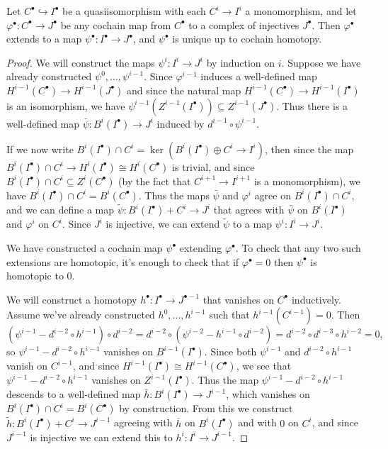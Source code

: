 \begin{thm}\label{resolution} Let $C^\bullet \hookrightarrow I^\bullet$ be a quasiisomorphism with each $C^i \rightarrow I^i$ a monomorphism, and let $\varphi^\bullet: C^\bullet \rightarrow J^\bullet$ be any cochain map from $C^\bullet$ to a complex of injectives $J^\bullet$. Then $\varphi^\bullet$ extends to a map $\psi^\bullet: I^\bullet \rightarrow J^\bullet$, and $\psi^\bullet$ is unique up to cochain homotopy.
\end{thm}
\begin{proof} We will construct the maps $\psi^i : I^i \rightarrow J^i$ by induction on $i$. Suppose we have already constructed $\psi^0, ..., \psi^{i-1}$. Since $\varphi^{i-1}$ induces a well-defined map $H^{i-1}(C^\bullet) \rightarrow H^{i-1}(J^\bullet)$ and since the natural map $H^{i-1}(C^\bullet) \rightarrow H^{i-1}(I^\bullet)$ is an isomorphism, we have $\psi^{i-1}(Z^{i-1}(I^\bullet)) \subseteq Z^{i-1}(J^\bullet)$. Thus there is a well-defined map $\bar\psi : B^i(I^\bullet) \rightarrow J^i$ induced by $d^{i-1}\circ\psi^{i-1}$.

If we now write $B^i(I^\bullet)\cap C^i = \ker(B^i(I^\bullet)\oplus C^i \rightarrow I^i)$, then since the map $B^i(I^\bullet)\cap C^i \rightarrow H^i(I^\bullet) \cong H^i(C^\bullet)$ is trivial, and since $B^i(I^\bullet)\cap C^i \subseteq Z^i(C^\bullet)$ (by the fact that $C^{i+1}\rightarrow I^{i+1}$ is a monomorphism), we have $B^i(I^\bullet)\cap C^i = B^i(C^\bullet)$. Thus the maps $\bar\psi$ and $\varphi^i$ agree on $B^i(I^\bullet)\cap C^i$, and we can define a map $\widetilde\psi : B^i(I^\bullet)+C^i \rightarrow J^i$ that agrees with $\bar\psi$ on $B^i(I^\bullet)$ and $\varphi^i$ on $C^i$. Since $J^i$ is injective, we can extend $\widetilde\psi$ to a map $\psi^i:I^i\rightarrow J^i$.

We have constructed a cochain map $\psi^\bullet$ extending $\varphi^\bullet$. To check that any two such extensions are homotopic, it's enough to check that if $\varphi^\bullet = 0$ then $\psi^\bullet$ is homotopic to $0$.

We will construct a homotopy $h^\bullet : I^\bullet \rightarrow J^{\bullet-1}$ that vanishes on $C^\bullet$ inductively. Assume we've already constructed $h^0, ..., h^{i-1}$ such that $h^{i-1}(C^{i-1}) = 0$. Then
\[
(\psi^{i-1} - d^{i-2}\circ h^{i-1})\circ d^{i-2} = d^{i-2}\circ(\psi^{i-2} - h^{i-1}\circ d^{i-2}) = d^{i-2}\circ d^{i-3}\circ h^{i-2} = 0,
\]
so $\psi^{i-1} - d^{i-2}\circ h^{i-1}$ vanishes on $B^{i-1}(I^\bullet)$. Since both $\psi^{i-1}$ and $d^{i-2}\circ h^{i-1}$ vanish on $C^{i-1}$, and since $H^{i-1}(I^\bullet)\cong H^{i-1}(C^\bullet)$, we see that $\psi^{i-1} - d^{i-2}\circ h^{i-1}$ vanishes on $Z^{i-1}(I^\bullet)$. Thus the map $\psi^{i-1} - d^{i-2}\circ h^{i-1}$ descends to a well-defined map $\bar{h}:B^i(I^\bullet)\rightarrow J^{i-1}$, which vanishes on $B^i(I^\bullet)\cap C^i = B^i(C^\bullet)$ by construction. From this we construct $\widetilde{h} : B^i(I^\bullet) + C^i \rightarrow J^{i-1}$ agreeing with $\bar{h}$ on $B^i(I^\bullet)$ and with $0$ on $C^i$, and since $J^{i-1}$ is injective we can extend this to $h^i : I^i \rightarrow J^{i-1}$.
\end{proof}

